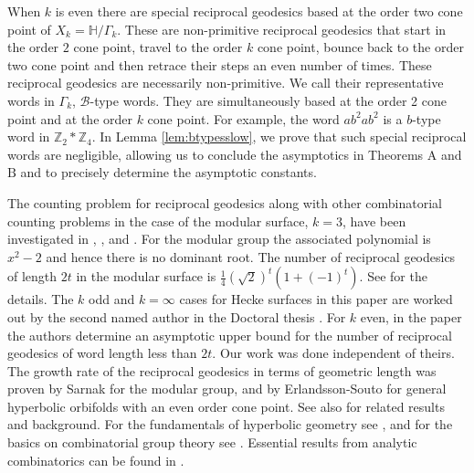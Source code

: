 \documentclass[11pt]{amsart}
\numberwithin{equation}{section}
\theoremstyle{plain}
\begin{document}
 When $k$ is even there are special  reciprocal geodesics based at the order two cone point of 
 $X_{k}=\mathbb{H}/\Gamma_{k}$.  These are non-primitive reciprocal geodesics that start in the order $2$ cone point,  travel to the 
order $k$ cone point, bounce back to the order two cone point and then retrace their steps an even number of times.  These reciprocal geodesics are necessarily non-primitive. We  call their representative words in 
$\Gamma_{k}$, $\mathcal{B}$-type words. They  are simultaneously based at the order 2 cone point and at the order $k$ cone point. 
 For example, the word $ab^{2}ab^{2}$ is a 
$b$-type word in $\mathbb{Z}_{2}*\mathbb{Z}_{4}$. In Lemma  \ref{lem:btypesslow}, we prove that such special reciprocal words  are negligible, allowing us to  conclude the asymptotics in Theorems $\text{A}$   and $\text{B}$ and to precisely determine the asymptotic constants. 
 
\vskip5pt
  The counting problem for reciprocal geodesics along with  other combinatorial counting problems in the case  of the modular surface, $k=3$,  have been investigated in     \cite{BasSuz}, \cite{BasSuz2}, and 
\cite{BasLiu}.  For the modular group the associated polynomial is $x^{2}-2$ and hence there is no dominant root. The number of reciprocal geodesics of length $2t$ in the modular surface is 
$\frac{1}{4}   \left(\sqrt{2} \right)^{t}\left(1+(-1)^{t}\right)$. 
See  \cite{BasSuz} for the details.                                         
The $k$ odd   and $k=\infty$ cases  for Hecke surfaces  in this paper are  worked out by the second named author in the Doctoral  thesis  \cite{Mar}. For $k$ even, in the paper \cite{DasGon2} the authors determine an asymptotic upper bound for the number of reciprocal geodesics of word length less than $2t$.   Our work was done  independent of theirs. 
The growth rate of the reciprocal geodesics 
  in terms of geometric length  was proven  by   Sarnak \cite{Sar} for the modular group,  and by Erlandsson-Souto 
  \cite{ErSo2}   for  general hyperbolic orbifolds with an even order  cone point. See also \cite{BasSuz, B-K3, DasGon, Er, ErPaSo, ErSo, Mirz, Ri, Tra} for related results and background. For the fundamentals of hyperbolic geometry see \cite{Bus},  and for the basics on combinatorial group theory see \cite{LyndSch, Mag}.  Essential results from analytic combinatorics can be found in  \cite{Fla-Ph}.
  
\end{document}
